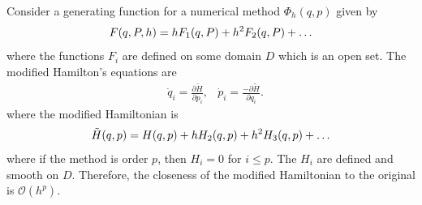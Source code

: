 \begin{theorem}
Consider a generating function for a numerical method $\Phi_h(q,p)$ given by
\begin{equation}
	F(q,P,h) = h F_1(q,P) + h^2 F_2(q,P) + \mathellipsis
	\label{eqn:methodgen}
\end{equation}
where the functions $F_i$ are defined on some domain $D$ which is an open set.
The modified Hamilton's equations are 
\begin{align*}
	&\dot{q}_i = \frac{\partial \tilde{H}}{\partial p_i}, &\dot{p}_i = \frac{- \partial \tilde{H}}{\partial q_i}.
\end{align*}
where the modified Hamiltonian is
\begin{equation}
	\tilde{H}(q,p) = H(q,p) + h H_2(q,p) + h^2 H_3(q,p) + \mathellipsis
	\label{eqn:powerham}	
\end{equation}
where if the method is order $p$, then $H_i = 0$ for $i \leq p$.
The $H_i$ are defined and smooth on $D$.
Therefore, the closeness of the modified Hamiltonian to the original is $\mathcal{O}(h^p)$.
\end{theorem}


